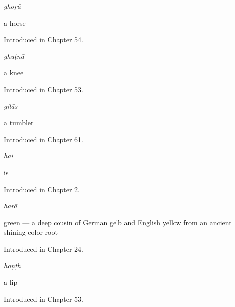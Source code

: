 \noindent\begin{minipage}[t]{\linewidth}
\raggedright
\textbf{}\enspace\emph{ghoṛā}\par
\small a horse\par
\footnotesize Introduced in Chapter 54.
\end{minipage}\par\medskip

\noindent\begin{minipage}[t]{\linewidth}
\raggedright
\textbf{}\enspace\emph{ghuṭnā}\par
\small a knee\par
\footnotesize Introduced in Chapter 53.
\end{minipage}\par\medskip

\noindent\begin{minipage}[t]{\linewidth}
\raggedright
\textbf{}\enspace\emph{gilās}\par
\small a tumbler\par
\footnotesize Introduced in Chapter 61.
\end{minipage}\par\medskip

\noindent\begin{minipage}[t]{\linewidth}
\raggedright
\textbf{}\enspace\emph{hai}\par
\small is\par
\footnotesize Introduced in Chapter 2.
\end{minipage}\par\medskip

\noindent\begin{minipage}[t]{\linewidth}
\raggedright
\textbf{}\enspace\emph{harā}\par
\small green — a deep cousin of German gelb and English yellow from an ancient shining-color root\par
\footnotesize Introduced in Chapter 24.
\end{minipage}\par\medskip

\noindent\begin{minipage}[t]{\linewidth}
\raggedright
\textbf{}\enspace\emph{hoṇṭh}\par
\small a lip\par
\footnotesize Introduced in Chapter 53.
\end{minipage}\par\medskip

